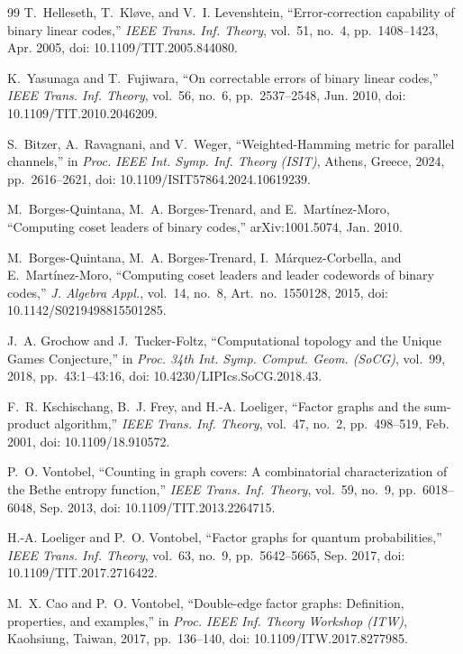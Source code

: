 \documentclass[journal]{IEEEtran}
\theoremstyle{definition}
\theoremstyle{remark}
\begin{document}
\begin{thebibliography}{99}
T.~Helleseth, T.~Kl{\o}ve, and V.~I. Levenshtein, ``Error-correction capability
of binary linear codes,'' \emph{IEEE Trans. Inf. Theory}, vol.~51, no.~4,
pp.~1408--1423, Apr. 2005, doi: 10.1109/TIT.2005.844080.

K.~Yasunaga and T.~Fujiwara, ``On correctable errors of binary linear codes,''
\emph{IEEE Trans. Inf. Theory}, vol.~56, no.~6, pp.~2537--2548, Jun. 2010,
doi: 10.1109/TIT.2010.2046209.

S.~Bitzer, A.~Ravagnani, and V.~Weger, ``Weighted-Hamming metric for parallel
channels,'' in \emph{Proc. IEEE Int. Symp. Inf. Theory (ISIT)}, Athens, Greece,
2024, pp.~2616--2621, doi: 10.1109/ISIT57864.2024.10619239.

M.~Borges-Quintana, M.~A. Borges-Trenard, and E.~Mart\'inez-Moro,
``Computing coset leaders of binary codes,'' arXiv:1001.5074, Jan. 2010.

M.~Borges-Quintana, M.~A. Borges-Trenard, I.~M\'arquez-Corbella, and
E.~Mart\'inez-Moro, ``Computing coset leaders and leader codewords of binary
codes,'' \emph{J. Algebra Appl.}, vol.~14, no.~8, Art.~no.~1550128, 2015,
doi: 10.1142/S0219498815501285.

J.~A. Grochow and J.~Tucker-Foltz, ``Computational topology and the Unique
Games Conjecture,'' in \emph{Proc. 34th Int. Symp. Comput. Geom. (SoCG)},
vol.~99, 2018, pp.~43:1--43:16, doi: 10.4230/LIPIcs.SoCG.2018.43.

F.~R. Kschischang, B.~J. Frey, and H.-A. Loeliger, ``Factor graphs and the
sum-product algorithm,'' \emph{IEEE Trans. Inf. Theory}, vol.~47, no.~2,
pp.~498--519, Feb. 2001, doi: 10.1109/18.910572.

P.~O. Vontobel, ``Counting in graph covers: A combinatorial characterization
of the Bethe entropy function,'' \emph{IEEE Trans. Inf. Theory}, vol.~59,
no.~9, pp.~6018--6048, Sep. 2013, doi: 10.1109/TIT.2013.2264715.

H.-A. Loeliger and P.~O. Vontobel, ``Factor graphs for quantum
probabilities,'' \emph{IEEE Trans. Inf. Theory}, vol.~63, no.~9,
pp.~5642--5665, Sep. 2017, doi: 10.1109/TIT.2017.2716422.

M.~X. Cao and P.~O. Vontobel, ``Double-edge factor graphs: Definition,
properties, and examples,'' in \emph{Proc. IEEE Inf. Theory Workshop (ITW)},
Kaohsiung, Taiwan, 2017, pp.~136--140, doi: 10.1109/ITW.2017.8277985.


\end{thebibliography}
\end{document}
